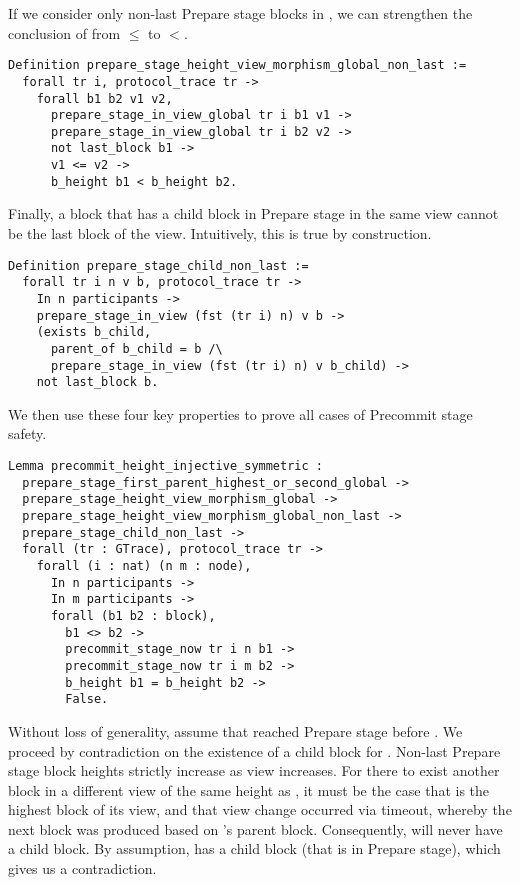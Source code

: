 \documentclass{easychair}
\begin{document}
\noindent
If we consider only non-last Prepare stage blocks in , we can strengthen the conclusion of  from $\leq$ to $<$.
\begin{lstlisting}
Definition prepare_stage_height_view_morphism_global_non_last :=
  forall tr i, protocol_trace tr ->
    forall b1 b2 v1 v2,
      prepare_stage_in_view_global tr i b1 v1 ->
      prepare_stage_in_view_global tr i b2 v2 ->
      not last_block b1 ->
      v1 <= v2 ->
      b_height b1 < b_height b2.
\end{lstlisting}

\noindent
Finally, a block that has a child block in Prepare stage in the same view cannot be the last block of the view. Intuitively, this is true by construction.
\begin{lstlisting}
Definition prepare_stage_child_non_last :=
  forall tr i n v b, protocol_trace tr ->
    In n participants ->
    prepare_stage_in_view (fst (tr i) n) v b ->
    (exists b_child,
      parent_of b_child = b /\
      prepare_stage_in_view (fst (tr i) n) v b_child) ->
    not last_block b.
\end{lstlisting}

\noindent
We then use these four key properties to prove all cases of Precommit stage safety. 
\begin{lstlisting}
Lemma precommit_height_injective_symmetric :
  prepare_stage_first_parent_highest_or_second_global ->
  prepare_stage_height_view_morphism_global ->
  prepare_stage_height_view_morphism_global_non_last ->
  prepare_stage_child_non_last ->
  forall (tr : GTrace), protocol_trace tr ->
    forall (i : nat) (n m : node),
      In n participants ->
      In m participants ->
      forall (b1 b2 : block),
        b1 <> b2 ->
        precommit_stage_now tr i n b1 ->
        precommit_stage_now tr i m b2 ->
        b_height b1 = b_height b2 ->
        False.
\end{lstlisting}

Without loss of generality, assume that  reached Prepare stage before . We proceed by contradiction on the existence of a child block for . Non-last Prepare stage block heights strictly increase as view increases. For there to exist another block in a different view of the same height as , it must be the case that  is the highest block of its view, and that view change occurred via timeout, whereby the next block was produced based on 's parent block. Consequently,  will never have a child block. By assumption,  has a child block (that is in Prepare stage), which gives us a contradiction.
\end{document}
